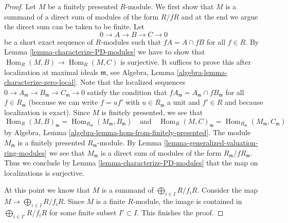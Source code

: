 \documentclass[10pt,a4paper]{amsart}
\theoremstyle{plain}
\theoremstyle{definition}
\theoremstyle{remark}
\numberwithin{equation}{subsection}
\def\Hom{\mathop{\mathrm{Hom}}\nolimits}
\begin{document}
\begin{proof}
Let $M$ be a finitely presented $R$-module. We first show that $M$ is a
summand of a direct sum of modules of the form $R/fR$ and at the end we
argue the direct sum can be taken to be finite. Let
$$
0 \to A \to B \to C \to 0
$$
be a short exact sequence of $R$-modules such that $fA = A \cap fB$
for all $f \in R$. By Lemma \ref{lemma-characterize-PD-modules}
we have to show that $\Hom_R(M, B) \to \Hom_R(M, C)$ is surjective.
It suffices to prove this after localization at maximal ideals
$\mathfrak m$, see
Algebra, Lemma \ref{algebra-lemma-characterize-zero-local}.
Note that the localized
sequences $0 \to A_\mathfrak m \to B_\mathfrak m \to C_\mathfrak m \to 0$
satisfy the condition that $fA_\mathfrak m = A_\mathfrak m \cap fB_\mathfrak m$
for all $f \in R_\mathfrak m$ (because we can write $f = uf'$ with
$u \in R_\mathfrak m$ a unit and $f' \in R$ and because localization
is exact). Since $M$ is finitely presented, we see that
$$
\Hom_R(M, B)_\mathfrak m = \Hom_{R_\mathfrak m}(M_\mathfrak m, B_\mathfrak m)
\quad\text{and}\quad
\Hom_R(M, C)_\mathfrak m = \Hom_{R_\mathfrak m}(M_\mathfrak m, C_\mathfrak m)
$$
by Algebra, Lemma \ref{algebra-lemma-hom-from-finitely-presented}.
The module $M_\mathfrak m$ is a finitely presented $R_\mathfrak m$-module. By
Lemma \ref{lemma-generalized-valuation-ring-modules}
we see that $M_\mathfrak m$ is a direct sum of modules
of the form $R_\mathfrak m/fR_\mathfrak m$. Thus we conclude by
Lemma \ref{lemma-characterize-PD-modules} that the map on
localizations is surjective.

\medskip\noindent
At this point we know that $M$ is a summand of
$\bigoplus_{i \in I} R/f_i R$. Consider the map
$M \to \bigoplus_{i \in I} R/f_i R$. Since $M$ is a finite $R$-module,
the image is contained in $\bigoplus_{i \in I'} R/f_i R$ for some finite
subset $I' \subset I$. This finishes the proof.
\end{proof}
\end{document}

